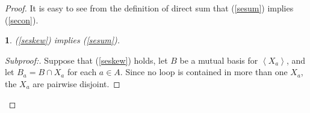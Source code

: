 \documentclass{amsart}
\theoremstyle{plain}
\newtheorem{claim}{}[theorem]
\theoremstyle{definition}
\newcommand{\ab}[1]{\left\langle#1\right\rangle}
\newenvironment{subproof}[1][\proofname]{%
  \renewcommand{\qedsymbol}{$\blacksquare$}%
  \begin{proof}[Subproof:]%
}{%
  \end{proof}%
}
\begin{document}
\begin{proof}
  It is easy to see from the definition of direct sum that (\ref{sesum}) implies (\ref{secon}). 
  \begin{claim} (\ref{seskew}) implies (\ref{sesum}).
  \end{claim}
  \begin{subproof}
    Suppose that (\ref{seskew}) holds, let $B$ be a mutual basis for $\ab{X_a}$, 
    and let $B_a = B \cap X_a$ for each $a \in A$. 
    Since no loop is contained in more than one $X_a$, the $X_a$ are pairwise disjoint. 
  

\end{subproof}
\end{proof}
\end{document}
